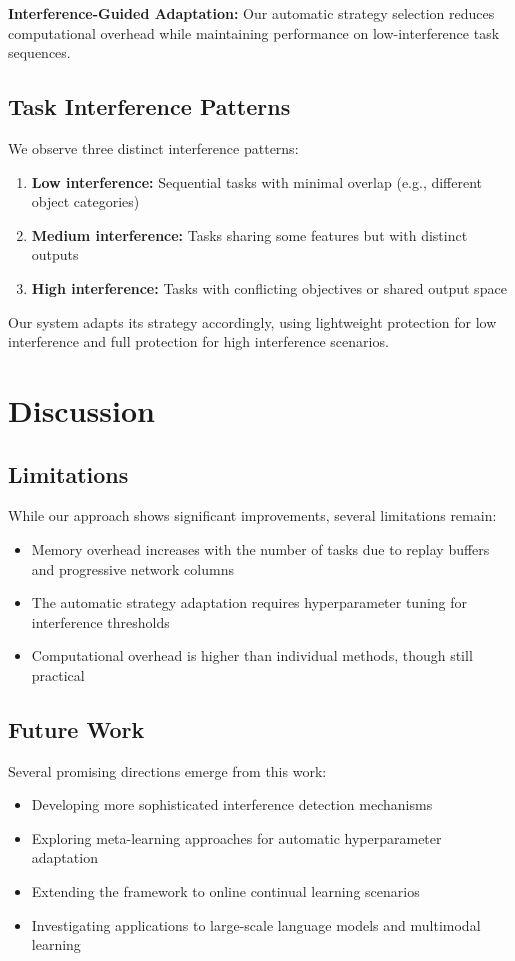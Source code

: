 \documentclass{article}
\begin{document}
\textbf{Interference-Guided Adaptation:} Our automatic strategy selection reduces computational overhead while maintaining performance on low-interference task sequences.

\subsection{Task Interference Patterns}

We observe three distinct interference patterns:
\begin{enumerate}
    \item \textbf{Low interference:} Sequential tasks with minimal overlap (e.g., different object categories)
    \item \textbf{Medium interference:} Tasks sharing some features but with distinct outputs
    \item \textbf{High interference:} Tasks with conflicting objectives or shared output space
\end{enumerate}

Our system adapts its strategy accordingly, using lightweight protection for low interference and full protection for high interference scenarios.

\section{Discussion}

\subsection{Limitations}

While our approach shows significant improvements, several limitations remain:
\begin{itemize}
    \item Memory overhead increases with the number of tasks due to replay buffers and progressive network columns
    \item The automatic strategy adaptation requires hyperparameter tuning for interference thresholds
    \item Computational overhead is higher than individual methods, though still practical
\end{itemize}

\subsection{Future Work}

Several promising directions emerge from this work:
\begin{itemize}
    \item Developing more sophisticated interference detection mechanisms
    \item Exploring meta-learning approaches for automatic hyperparameter adaptation
    \item Extending the framework to online continual learning scenarios
    \item Investigating applications to large-scale language models and multimodal learning
\end{itemize}
\end{document}
